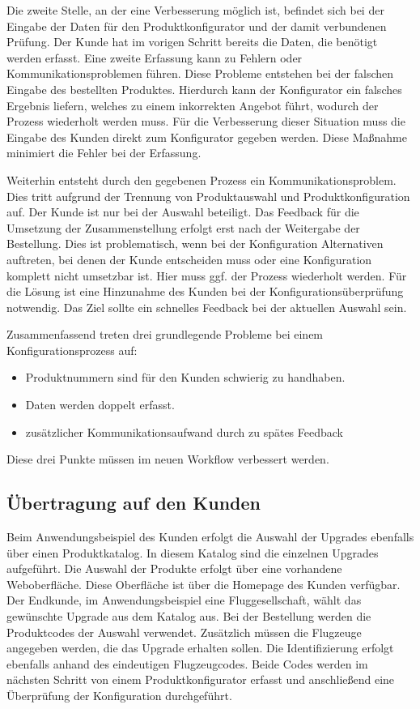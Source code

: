Die zweite Stelle, an der eine Verbesserung möglich ist, befindet sich bei der Eingabe der Daten für den Produktkonfigurator und der damit verbundenen Prüfung. Der Kunde hat im vorigen Schritt bereits die Daten, die benötigt werden erfasst. Eine zweite Erfassung kann zu Fehlern oder Kommunikationsproblemen führen. Diese Probleme entstehen bei der falschen Eingabe des bestellten Produktes. Hierdurch kann der Konfigurator ein falsches Ergebnis liefern, welches zu einem inkorrekten Angebot führt, wodurch der Prozess wiederholt werden muss. Für die Verbesserung dieser Situation muss die Eingabe des Kunden direkt zum Konfigurator gegeben werden. Diese Maßnahme minimiert die Fehler bei der Erfassung. 

Weiterhin entsteht durch den gegebenen Prozess ein Kommunikationsproblem. Dies tritt aufgrund der Trennung von Produktauswahl und Produktkonfiguration auf. Der Kunde ist nur bei der Auswahl beteiligt. Das Feedback für die Umsetzung der Zusammenstellung erfolgt erst nach der Weitergabe der Bestellung. Dies ist problematisch, wenn bei der Konfiguration Alternativen auftreten, bei denen der Kunde entscheiden muss oder eine Konfiguration komplett nicht umsetzbar ist. Hier muss ggf. der Prozess wiederholt werden. Für die Lösung ist eine Hinzunahme des Kunden bei der Konfigurationsüberprüfung notwendig. Das Ziel sollte ein schnelles Feedback bei der aktuellen Auswahl sein. 

Zusammenfassend treten drei grundlegende Probleme bei einem Konfigurationsprozess auf:
\begin{itemize}
        \item Produktnummern sind für den Kunden schwierig zu handhaben.
        
        \item Daten werden doppelt erfasst.
        
        \item zusätzlicher Kommunikationsaufwand durch zu spätes Feedback
\end{itemize}
Diese drei Punkte müssen im neuen Workflow verbessert werden.

\subsection{Übertragung auf den Kunden}
Beim Anwendungsbeispiel des Kunden erfolgt die Auswahl der Upgrades ebenfalls über einen Produktkatalog. In diesem Katalog sind die einzelnen Upgrades aufgeführt. Die Auswahl der Produkte erfolgt über eine vorhandene Weboberfläche. Diese Oberfläche ist über die Homepage des Kunden verfügbar. Der Endkunde, im Anwendungsbeispiel eine Fluggesellschaft, wählt das gewünschte Upgrade aus dem Katalog aus. Bei der Bestellung werden die Produktcodes der Auswahl verwendet. Zusätzlich müssen die Flugzeuge angegeben werden, die das Upgrade erhalten sollen. Die Identifizierung erfolgt ebenfalls anhand des eindeutigen Flugzeugcodes. Beide Codes werden im nächsten Schritt von einem Produktkonfigurator erfasst und anschließend eine Überprüfung der Konfiguration durchgeführt.   \par 

